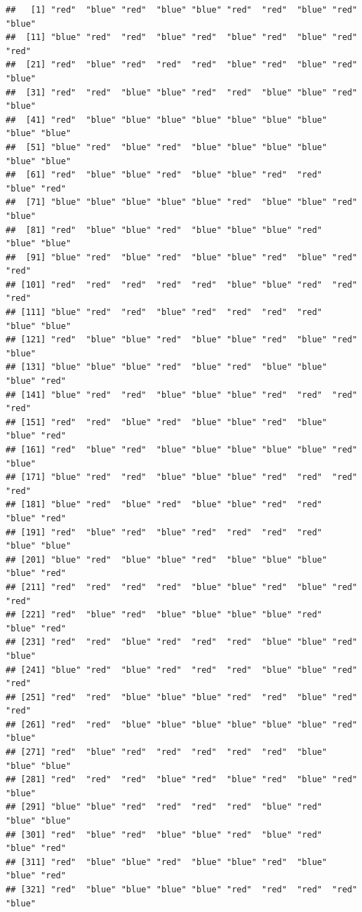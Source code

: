 \documentclass[
]{book}
\theoremstyle{definition}
\theoremstyle{definition}
\theoremstyle{definition}
\theoremstyle{definition}
\theoremstyle{remark}
\begin{document}
\begin{verbatim}
##   [1] "red"  "blue" "red"  "blue" "blue" "red"  "red"  "blue" "red"  "blue"
##  [11] "blue" "red"  "red"  "blue" "red"  "blue" "red"  "blue" "red"  "red" 
##  [21] "red"  "blue" "red"  "red"  "red"  "blue" "red"  "blue" "red"  "blue"
##  [31] "red"  "red"  "blue" "blue" "red"  "red"  "blue" "blue" "red"  "blue"
##  [41] "red"  "blue" "blue" "blue" "blue" "blue" "blue" "blue" "blue" "blue"
##  [51] "blue" "red"  "blue" "red"  "blue" "blue" "blue" "blue" "blue" "blue"
##  [61] "red"  "blue" "blue" "red"  "blue" "blue" "red"  "red"  "blue" "red" 
##  [71] "blue" "blue" "blue" "blue" "blue" "red"  "blue" "blue" "red"  "blue"
##  [81] "red"  "blue" "blue" "red"  "blue" "blue" "blue" "red"  "blue" "blue"
##  [91] "blue" "red"  "blue" "red"  "blue" "blue" "red"  "blue" "red"  "red" 
## [101] "red"  "red"  "red"  "red"  "red"  "blue" "blue" "red"  "red"  "red" 
## [111] "blue" "red"  "red"  "blue" "red"  "red"  "red"  "red"  "blue" "blue"
## [121] "red"  "blue" "blue" "red"  "blue" "blue" "red"  "blue" "red"  "blue"
## [131] "blue" "blue" "blue" "red"  "blue" "red"  "blue" "blue" "blue" "red" 
## [141] "blue" "red"  "red"  "blue" "blue" "blue" "red"  "red"  "red"  "red" 
## [151] "red"  "red"  "blue" "red"  "blue" "blue" "red"  "blue" "blue" "red" 
## [161] "red"  "blue" "red"  "blue" "blue" "blue" "blue" "blue" "red"  "blue"
## [171] "blue" "red"  "red"  "blue" "blue" "blue" "red"  "red"  "red"  "red" 
## [181] "blue" "red"  "blue" "red"  "blue" "blue" "red"  "red"  "blue" "red" 
## [191] "red"  "blue" "red"  "blue" "red"  "red"  "red"  "red"  "blue" "blue"
## [201] "blue" "red"  "blue" "blue" "red"  "blue" "blue" "blue" "blue" "red" 
## [211] "red"  "red"  "red"  "red"  "blue" "blue" "red"  "blue" "red"  "red" 
## [221] "red"  "blue" "red"  "blue" "blue" "blue" "blue" "red"  "blue" "red" 
## [231] "red"  "red"  "blue" "red"  "red"  "red"  "blue" "blue" "red"  "blue"
## [241] "blue" "red"  "blue" "red"  "red"  "red"  "blue" "blue" "red"  "red" 
## [251] "red"  "red"  "blue" "blue" "blue" "red"  "red"  "blue" "red"  "red" 
## [261] "red"  "red"  "blue" "blue" "blue" "blue" "blue" "blue" "red"  "blue"
## [271] "red"  "blue" "red"  "red"  "red"  "red"  "red"  "blue" "blue" "blue"
## [281] "red"  "red"  "red"  "blue" "red"  "blue" "red"  "blue" "red"  "blue"
## [291] "blue" "blue" "red"  "red"  "red"  "red"  "blue" "red"  "blue" "blue"
## [301] "red"  "blue" "red"  "blue" "blue" "red"  "blue" "red"  "blue" "red" 
## [311] "red"  "blue" "blue" "red"  "blue" "blue" "red"  "blue" "blue" "red" 
## [321] "red"  "blue" "blue" "blue" "blue" "red"  "red"  "red"  "red"  "blue"

\end{verbatim}
\end{document}
